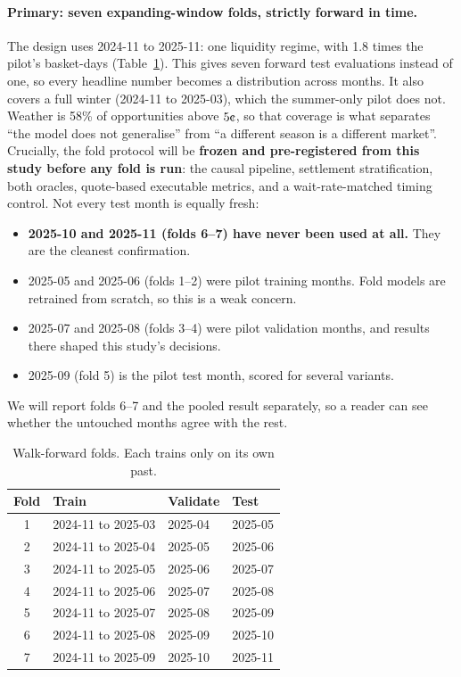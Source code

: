 \documentclass[11pt,a4paper]{article}
\newcommand{\cent}{\text{\textcent}}
\begin{document}
\paragraph{Primary: seven expanding-window folds, strictly forward in time.}
The design uses 2024-11 to 2025-11: one liquidity regime, with 1.8 times the
pilot's basket-days (Table~\ref{tab:folds}). This gives seven forward test
evaluations instead of one, so every headline number becomes a distribution
across months. It also covers a full winter (2024-11 to 2025-03), which the
summer-only pilot does not. Weather is 58\% of opportunities above $5\cent$, so
that coverage is what separates ``the model does not generalise'' from ``a
different season is a different market''. Crucially, the fold protocol will be
\textbf{frozen and pre-registered from this study before any fold is run}: the
causal pipeline, settlement stratification, both oracles, quote-based
executable metrics, and a wait-rate-matched timing control. Not every test month is equally fresh:
\begin{itemize}
  \item \textbf{2025-10 and 2025-11 (folds 6--7) have never been used at all.}
    They are the cleanest confirmation.
  \item 2025-05 and 2025-06 (folds 1--2) were pilot training months. Fold models
    are retrained from scratch, so this is a weak concern.
  \item 2025-07 and 2025-08 (folds 3--4) were pilot validation months, and
    results there shaped this study's decisions.
  \item 2025-09 (fold 5) is the pilot test month, scored for several variants.
\end{itemize}
We will report folds 6--7 and the pooled result separately, so a reader can see
whether the untouched months agree with the rest.

\begin{table}[h]
\centering\small
\caption{Walk-forward folds. Each trains only on its own past.}
\label{tab:folds}
\begin{tabular}{clll}
\toprule
Fold & Train & Validate & Test \\
\midrule
1 & 2024-11 to 2025-03 & 2025-04 & 2025-05 \\
2 & 2024-11 to 2025-04 & 2025-05 & 2025-06 \\
3 & 2024-11 to 2025-05 & 2025-06 & 2025-07 \\
4 & 2024-11 to 2025-06 & 2025-07 & 2025-08 \\
5 & 2024-11 to 2025-07 & 2025-08 & 2025-09 \\
6 & 2024-11 to 2025-08 & 2025-09 & 2025-10 \\
7 & 2024-11 to 2025-09 & 2025-10 & 2025-11 \\
\bottomrule
\end{tabular}
\end{table}
\end{document}

